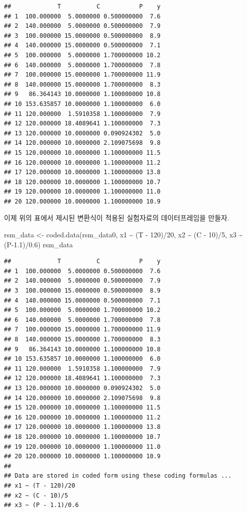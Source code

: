 \documentclass[
]{book}
\newenvironment{Shaded}{\begin{snugshade}}{\end{snugshade}}
\newcommand{\DecValTok}[1]{\textcolor[rgb]{0.00,0.00,0.81}{#1}}
\newcommand{\FloatTok}[1]{\textcolor[rgb]{0.00,0.00,0.81}{#1}}
\newcommand{\FunctionTok}[1]{\textcolor[rgb]{0.00,0.00,0.00}{#1}}
\newcommand{\NormalTok}[1]{#1}
\newcommand{\OtherTok}[1]{\textcolor[rgb]{0.56,0.35,0.01}{#1}}
\newcommand{\SpecialCharTok}[1]{\textcolor[rgb]{0.00,0.00,0.00}{#1}}
\theoremstyle{definition}
\theoremstyle{definition}
\theoremstyle{definition}
\theoremstyle{definition}
\theoremstyle{remark}
\begin{document}
\begin{verbatim}
##             T          C           P    y
## 1  100.000000  5.0000000 0.500000000  7.6
## 2  140.000000  5.0000000 0.500000000  7.9
## 3  100.000000 15.0000000 0.500000000  8.9
## 4  140.000000 15.0000000 0.500000000  7.1
## 5  100.000000  5.0000000 1.700000000 10.2
## 6  140.000000  5.0000000 1.700000000  7.8
## 7  100.000000 15.0000000 1.700000000 11.9
## 8  140.000000 15.0000000 1.700000000  8.3
## 9   86.364143 10.0000000 1.100000000 10.8
## 10 153.635857 10.0000000 1.100000000  6.0
## 11 120.000000  1.5910358 1.100000000  7.9
## 12 120.000000 18.4089641 1.100000000  7.3
## 13 120.000000 10.0000000 0.090924302  5.0
## 14 120.000000 10.0000000 2.109075698  9.8
## 15 120.000000 10.0000000 1.100000000 11.5
## 16 120.000000 10.0000000 1.100000000 11.2
## 17 120.000000 10.0000000 1.100000000 13.8
## 18 120.000000 10.0000000 1.100000000 10.7
## 19 120.000000 10.0000000 1.100000000 11.0
## 20 120.000000 10.0000000 1.100000000 10.9
\end{verbatim}

이제 위의 표에서 제시된 변환식이 적용된 실험자료의 데이터프레임을 만들자.

\begin{Shaded}
\begin{Highlighting}[]
\NormalTok{rsm\_data }\OtherTok{\textless{}{-}} \FunctionTok{coded.data}\NormalTok{(rsm\_data0, x1 }\SpecialCharTok{\textasciitilde{}}\NormalTok{ (T }\SpecialCharTok{{-}} \DecValTok{120}\NormalTok{)}\SpecialCharTok{/}\DecValTok{20}\NormalTok{, x2 }\SpecialCharTok{\textasciitilde{}}\NormalTok{ (C }\SpecialCharTok{{-}} \DecValTok{10}\NormalTok{)}\SpecialCharTok{/}\DecValTok{5}\NormalTok{, x3 }\SpecialCharTok{\textasciitilde{}}\NormalTok{ (P}\FloatTok{{-}1.1}\NormalTok{)}\SpecialCharTok{/}\FloatTok{0.6}\NormalTok{)}
\NormalTok{rsm\_data}
\end{Highlighting}
\end{Shaded}

\begin{verbatim}
##             T          C           P    y
## 1  100.000000  5.0000000 0.500000000  7.6
## 2  140.000000  5.0000000 0.500000000  7.9
## 3  100.000000 15.0000000 0.500000000  8.9
## 4  140.000000 15.0000000 0.500000000  7.1
## 5  100.000000  5.0000000 1.700000000 10.2
## 6  140.000000  5.0000000 1.700000000  7.8
## 7  100.000000 15.0000000 1.700000000 11.9
## 8  140.000000 15.0000000 1.700000000  8.3
## 9   86.364143 10.0000000 1.100000000 10.8
## 10 153.635857 10.0000000 1.100000000  6.0
## 11 120.000000  1.5910358 1.100000000  7.9
## 12 120.000000 18.4089641 1.100000000  7.3
## 13 120.000000 10.0000000 0.090924302  5.0
## 14 120.000000 10.0000000 2.109075698  9.8
## 15 120.000000 10.0000000 1.100000000 11.5
## 16 120.000000 10.0000000 1.100000000 11.2
## 17 120.000000 10.0000000 1.100000000 13.8
## 18 120.000000 10.0000000 1.100000000 10.7
## 19 120.000000 10.0000000 1.100000000 11.0
## 20 120.000000 10.0000000 1.100000000 10.9
## 
## Data are stored in coded form using these coding formulas ...
## x1 ~ (T - 120)/20
## x2 ~ (C - 10)/5
## x3 ~ (P - 1.1)/0.6
\end{verbatim}
\end{document}
